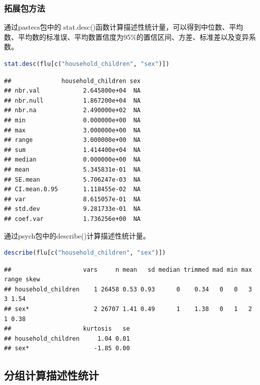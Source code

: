 \documentclass[]{ctexbook}
\begin{document}
\hypertarget{ux62d3ux5c55ux5305ux65b9ux6cd5}{%
\subsubsection{拓展包方法}\label{ux62d3ux5c55ux5305ux65b9ux6cd5}}

通过pastecs包中的 stat.desc()函数计算描述性统计量，可以得到中位数、平均数、平均数的标准误、平均数置信度为95\%的置信区间、方差、标准差以及变异系数。

\begin{lstlisting}[language=R]
stat.desc(flu[c("household_children", "sex")])
\end{lstlisting}

\begin{lstlisting}
##              household_children sex
## nbr.val            2.645800e+04  NA
## nbr.null           1.867200e+04  NA
## nbr.na             2.490000e+02  NA
## min                0.000000e+00  NA
## max                3.000000e+00  NA
## range              3.000000e+00  NA
## sum                1.414400e+04  NA
## median             0.000000e+00  NA
## mean               5.345831e-01  NA
## SE.mean            5.706247e-03  NA
## CI.mean.0.95       1.118455e-02  NA
## var                8.615057e-01  NA
## std.dev            9.281733e-01  NA
## coef.var           1.736256e+00  NA
\end{lstlisting}

通过psych包中的describe()计算描述性统计量。

\begin{lstlisting}[language=R]
describe(flu[c("household_children", "sex")])
\end{lstlisting}

\begin{lstlisting}
##                    vars     n mean   sd median trimmed mad min max range skew
## household_children    1 26458 0.53 0.93      0    0.34   0   0   3     3 1.54
## sex*                  2 26707 1.41 0.49      1    1.38   0   1   2     1 0.38
##                    kurtosis   se
## household_children     1.04 0.01
## sex*                  -1.85 0.00
\end{lstlisting}

\hypertarget{ux5206ux7ec4ux8ba1ux7b97ux63cfux8ff0ux6027ux7edfux8ba1}{%
\subsection{分组计算描述性统计}\label{ux5206ux7ec4ux8ba1ux7b97ux63cfux8ff0ux6027ux7edfux8ba1}}
\end{document}
